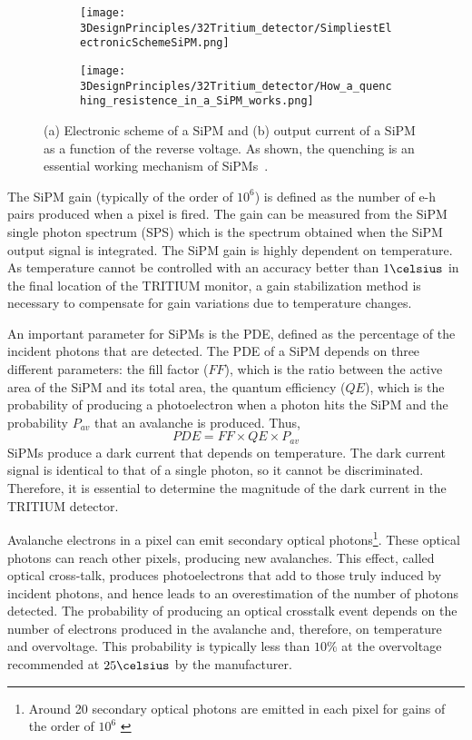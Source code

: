 \begin{figure}
\centering
    \begin{subfigure}[]{0.45\textwidth}
    \centering
    \texttt{[image: 3DesignPrinciples/32Tritium\_detector/SimpliestElectronicSchemeSiPM.png]}  
    \caption{\label{subfig:ElectricModelSiPM}}
    \end{subfigure}
    \hfill
    \begin{subfigure}[]{0.45\textwidth}
    \centering
    \texttt{[image: 3DesignPrinciples/32Tritium\_detector/How\_a\_quenching\_resistence\_in\_a\_SiPM\_works.png]}  
    \caption{\label{subfig:HowSiPMworks}}
    \end{subfigure}
 \caption{(a) Electronic scheme of a SiPM and (b) output current of a SiPM as a function of the reverse voltage. As shown, the quenching is an essential working mechanism of SiPMs~\cite{DataSheetSensL}.}
 \label{fig:ChenchingResistance}
\end{figure}

The SiPM gain (typically of the order of $10^6$) is defined as the number of e-h pairs produced when a pixel is fired. The gain can be measured from the SiPM single photon spectrum (SPS) which is the spectrum obtained when the SiPM output signal is integrated. The SiPM gain is highly dependent on temperature. As temperature cannot be controlled with an accuracy better than $1\celsius$ in the final location of the TRITIUM monitor, a gain stabilization method is necessary to compensate for gain variations due to temperature changes.

An important parameter for SiPMs is the PDE, defined as the percentage of the incident photons that are detected. The PDE of a SiPM depends on three different parameters: the fill factor ($FF$), which is the ratio between the active area of the SiPM and its total area, the quantum efficiency ($QE$), which is the probability of producing a photoelectron when a photon hits the SiPM and the probability $P_{av}$ that an avalanche is produced. Thus, 
\begin{equation}
PDE=FF \times QE \times P_{av}
\label{PDE_SiPM}
\end{equation}
SiPMs produce a dark current that depends on temperature. The dark current signal is identical to that of a single photon, so it cannot be discriminated. Therefore, it is essential to determine the magnitude of the dark current in the TRITIUM detector.

Avalanche electrons in a pixel can emit secondary optical photons\footnote{Around 20 secondary optical photons are emitted in each pixel for gains of the order of $10^6$ \cite{CrosstalkProbability}}. These optical photons can reach other pixels, producing new avalanches. This effect, called optical cross-talk, produces photoelectrons that add to those truly induced by incident photons, and hence leads to an overestimation of the number of photons detected. The probability of producing an optical crosstalk event depends on the number of electrons produced in the avalanche and, therefore, on temperature and overvoltage. This probability is typically less than $10\%$ at the overvoltage recommended at $25\celsius$ by the manufacturer.

